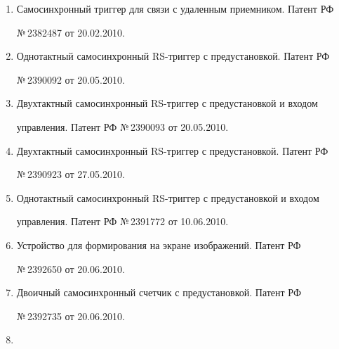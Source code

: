   \begin{enumerate}[1.]


\item {}


Самосинхронный триггер для связи с удаленным приемником. Патент РФ 


№\,2382487 от 20.02.2010.


\item {}


Однотактный самосинхронный RS-триг\-гер с предустановкой. Патент РФ 


№\,2390092 от 20.05.2010.


\item {}


Двухтактный самосинхронный RS-триг\-гер с предустановкой и входом 


управ\-ле\-ния. Патент РФ №\,2390093 от 20.05.2010.


\item {}


Двухтактный самосинхронный RS-триг\-гер с предустановкой. Патент РФ 


№\,2390923 от 27.05.2010.


\item {}


Однотактный самосинхронный RS-триг\-гер с предустановкой и входом 


управления. Патент РФ №\,2391772 от 10.06.2010.


\item {}


Устройство для формирования на экране изображений. Патент РФ 


№\,2392650 от 20.06.2010.


\item {}


Двоичный самосинхронный счетчик с предустановкой. Патент РФ 


№\,2392735 от 20.06.2010.


\item {}



\end{enumerate}
